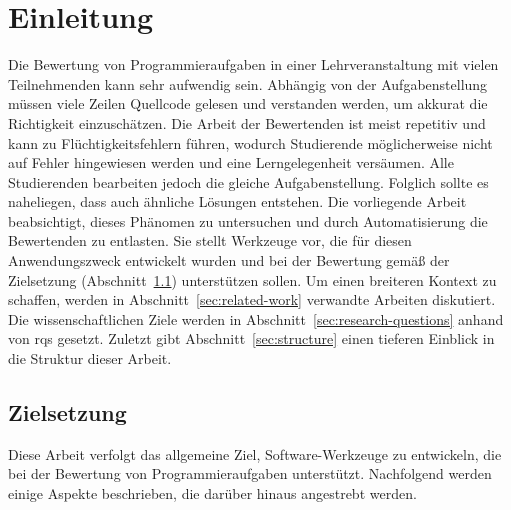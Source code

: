 \chapter{Einleitung}\label{ch:introduction}

Die Bewertung von Programmieraufgaben in einer Lehrveranstaltung mit vielen Teilnehmenden kann sehr aufwendig sein.
Abhängig von der Aufgabenstellung müssen viele Zeilen Quellcode gelesen und verstanden werden, um akkurat die Richtigkeit einzuschätzen.
Die Arbeit der Bewertenden ist meist repetitiv und kann zu Flüchtigkeitsfehlern führen, wodurch Studierende möglicherweise nicht auf Fehler hingewiesen werden und eine Lerngelegenheit versäumen.
Alle Studierenden bearbeiten jedoch die gleiche Aufgabenstellung.
Folglich sollte es naheliegen, dass auch ähnliche Lösungen entstehen.
Die vorliegende Arbeit beabsichtigt, dieses Phänomen zu untersuchen und durch Automatisierung die Bewertenden zu entlasten.
Sie stellt Werkzeuge vor, die für diesen Anwendungszweck entwickelt wurden und bei der Bewertung gemäß der Zielsetzung (Abschnitt~\ref{sec:goals}) unterstützen sollen.
Um einen breiteren Kontext zu schaffen, werden in Abschnitt~\ref{sec:related-work} verwandte Arbeiten diskutiert.
Die wissenschaftlichen Ziele werden in Abschnitt~\ref{sec:research-questions} anhand von \acp{rq} gesetzt.
Zuletzt gibt Abschnitt~\ref{sec:structure} einen tieferen Einblick in die Struktur dieser Arbeit.

\section{Zielsetzung}\label{sec:goals}

Diese Arbeit verfolgt das allgemeine Ziel, Software-Werkzeuge zu entwickeln, die bei der Bewertung von Programmieraufgaben unterstützt.
Nachfolgend werden einige Aspekte beschrieben, die darüber hinaus angestrebt werden.

